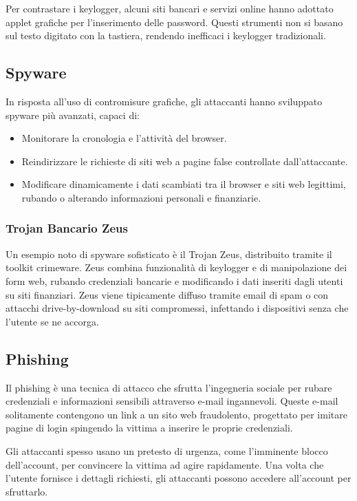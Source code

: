 Per contrastare i keylogger, alcuni siti bancari e servizi online hanno adottato applet grafiche per l'inserimento delle password. Questi strumenti non si basano sul testo digitato con la tastiera, rendendo inefficaci i keylogger tradizionali.

\subsection{Spyware}

In risposta all'uso di contromisure grafiche, gli attaccanti hanno sviluppato spyware più avanzati, capaci di:

\begin{itemize}
    \item Monitorare la cronologia e l'attività del browser.
    \item Reindirizzare le richieste di siti web a pagine false controllate dall'attaccante.
    \item Modificare dinamicamente i dati scambiati tra il browser e siti web legittimi, rubando o alterando informazioni personali e finanziarie.
\end{itemize}

\subsubsection{Trojan Bancario Zeus}

Un esempio noto di spyware sofisticato è il Trojan Zeus, distribuito tramite il toolkit crimeware. Zeus combina funzionalità di keylogger e di manipolazione dei form web, rubando credenziali bancarie e modificando i dati inseriti dagli utenti su siti finanziari. Zeus viene tipicamente diffuso tramite email di spam o con attacchi drive-by-download su siti compromessi, infettando i dispositivi senza che l'utente se ne accorga.

\subsection{Phishing}

Il phishing è una tecnica di attacco che sfrutta l'ingegneria sociale per rubare credenziali e informazioni sensibili attraverso e-mail ingannevoli. Queste e-mail solitamente contengono un link a un sito web fraudolento, progettato per imitare pagine di login spingendo la vittima a inserire le proprie credenziali.

Gli attaccanti spesso usano un pretesto di urgenza, come l'imminente blocco dell'account, per convincere la vittima ad agire rapidamente. Una volta che l'utente fornisce i dettagli richiesti, gli attaccanti possono accedere all'account per sfruttarlo.

